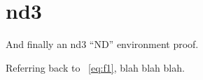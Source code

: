 \documentclass[12pt, twoside]{article}
\begin{document}
\break
\section{nd3}
And finally an nd3 ``ND'' environment proof.

Referring back to ~\eqref{eq:f1}, blah blah blah.


\begin{ND}
  \label{1}
  \label{2}
  \label{3}
\end{ND}
\end{document}
